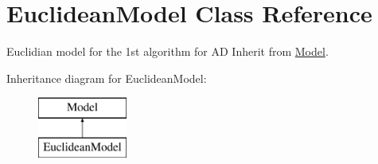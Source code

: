 \hypertarget{classEuclideanModel}{}\section{Euclidean\+Model Class Reference}
\label{classEuclideanModel}


Euclidian model for the 1st algorithm for A\+D Inherit from \hyperlink{classModel}{Model}.  


Inheritance diagram for Euclidean\+Model\+:\begin{figure}[H]
\begin{center}
\leavevmode
\includegraphics[height=2.000000cm]{classEuclideanModel}
\end{center}
\end{figure}

